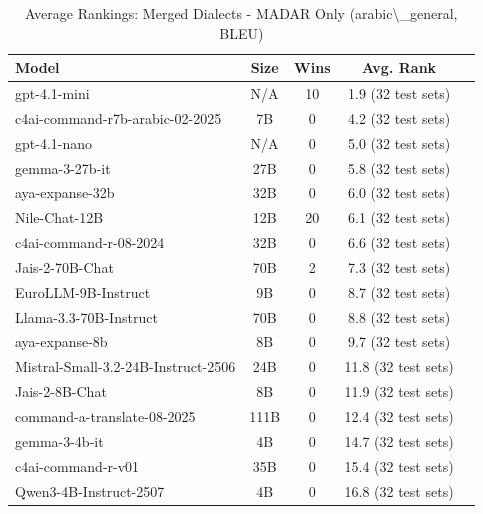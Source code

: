 \begin{table}[htbp]
\centering
\caption{Average Rankings: Merged Dialects - MADAR Only (arabic\textbackslash{}_general, BLEU)}
\label{tab:avg_rankings_bleu_arabic_general}
\begin{tabular}{l@{\hspace{3pt}}c@{\hspace{3pt}}c@{\hspace{3pt}}c@{\hspace{3pt}}c}
\toprule
Model & Size & Wins & Avg. Rank \\
\midrule
gpt-4.1-mini & N/A & 10 & 1.9 (32 test sets) \\
c4ai-command-r7b-arabic-02-2025 & 7B & 0 & 4.2 (32 test sets) \\
gpt-4.1-nano & N/A & 0 & 5.0 (32 test sets) \\
gemma-3-27b-it & 27B & 0 & 5.8 (32 test sets) \\
aya-expanse-32b & 32B & 0 & 6.0 (32 test sets) \\
Nile-Chat-12B & 12B & 20 & 6.1 (32 test sets) \\
c4ai-command-r-08-2024 & 32B & 0 & 6.6 (32 test sets) \\
Jais-2-70B-Chat & 70B & 2 & 7.3 (32 test sets) \\
EuroLLM-9B-Instruct & 9B & 0 & 8.7 (32 test sets) \\
Llama-3.3-70B-Instruct & 70B & 0 & 8.8 (32 test sets) \\
aya-expanse-8b & 8B & 0 & 9.7 (32 test sets) \\
Mistral-Small-3.2-24B-Instruct-2506 & 24B & 0 & 11.8 (32 test sets) \\
Jais-2-8B-Chat & 8B & 0 & 11.9 (32 test sets) \\
command-a-translate-08-2025 & 111B & 0 & 12.4 (32 test sets) \\
gemma-3-4b-it & 4B & 0 & 14.7 (32 test sets) \\
c4ai-command-r-v01 & 35B & 0 & 15.4 (32 test sets) \\
Qwen3-4B-Instruct-2507 & 4B & 0 & 16.8 (32 test sets) \\
\bottomrule
\end{tabular}
\end{table}